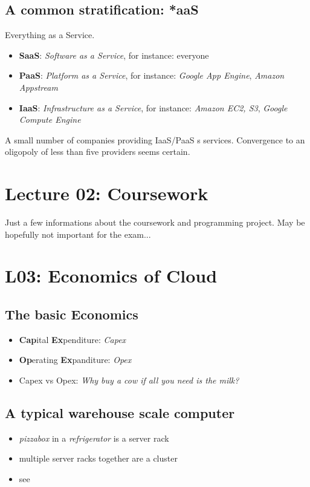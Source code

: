 \documentclass[a4paper]{article}
\begin{document}
\begin{multicols}{3}
\subsection{A common stratification: *aaS}
\label{subsec:everythingasaservice}
Everything as a Service.
\begin{itemize}
    \item \textbf{SaaS}: \textit{Software as a Service}, for instance: everyone
    \item \textbf{PaaS}: \textit{Platform as a Service}, for instance: \textit{Google App Engine}, \textit{Amazon Appstream}
    \item \textbf{IaaS}: \textit{Infrastructure as a Service}, for instance: \textit{Amazon EC2, S3}, \textit{Google Compute Engine}
\end{itemize}

A small number of companies providing IaaS/PaaS s services. Convergence to an oligopoly of less than five providers seems certain.

\section{Lecture 02: Coursework}

Just a few informations about the coursework and programming project. May be hopefully not important for the exam...

\section{L03: Economics of Cloud}

\subsection{The basic Economics}
\begin{itemize}
    \item \textbf{Cap}ital \textbf{Ex}penditure: \textit{Capex}
    \item \textbf{Op}erating \textbf{Ex}panditure: \textit{Opex}
    \item Capex vs Opex: \textit{Why buy a cow if all you need is the milk?}
\end{itemize}

\subsection{A typical warehouse scale computer}
\begin{itemize}
    \item \textit{pizzabox} in a \textit{refrigerator} is a server rack
    \item multiple server racks together are a cluster
    \item see 
\end{itemize}


\end{multicols}
\end{document}
